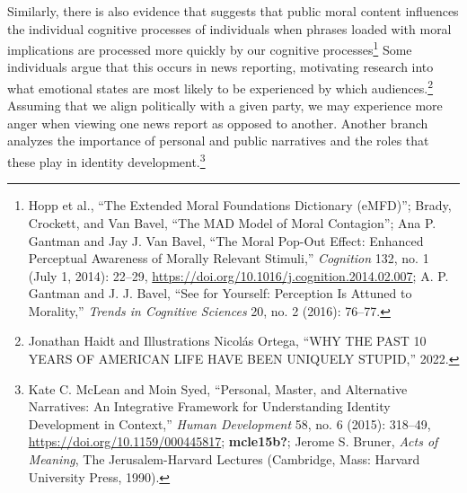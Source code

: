 \documentclass[phdthesis,12pt,final]{wuthesis}
\theoremstyle{definition}
\theoremstyle{definition}
\theoremstyle{definition}
\theoremstyle{definition}
\theoremstyle{remark}
\begin{document}
Similarly, there is also evidence that suggests that public moral content influences the individual cognitive processes of individuals when phrases loaded with moral implications are processed more quickly by our cognitive processes\footnote{Hopp et al., {``The Extended {Moral Foundations Dictionary} ({eMFD})''}; Brady, Crockett, and Van Bavel, {``The {MAD} Model of Moral Contagion''}; Ana P. Gantman and Jay J. Van Bavel, {``The Moral Pop-Out Effect: {Enhanced} Perceptual Awareness of Morally Relevant Stimuli,''} \emph{Cognition} 132, no. 1 (July 1, 2014): 22--29, \url{https://doi.org/10.1016/j.cognition.2014.02.007}; A. P. Gantman and J. J. Bavel, {``See for Yourself: Perception Is Attuned to Morality,''} \emph{Trends in Cognitive Sciences} 20, no. 2 (2016): 76--77.} Some individuals argue that this occurs in news reporting, motivating research into what emotional states are most likely to be experienced by which audiences.\footnote{Jonathan Haidt and Illustrations Nicolás Ortega, {``{WHY THE PAST} 10 {YEARS OF AMERICAN LIFE HAVE BEEN UNIQUELY STUPID},''} 2022.} Assuming that we align politically with a given party, we may experience more anger when viewing one news report as opposed to another. Another branch analyzes the importance of personal and public narratives and the roles that these play in identity development.\footnote{Kate C. McLean and Moin Syed, {``Personal, {Master}, and {Alternative Narratives}: {An Integrative Framework} for {Understanding Identity Development} in {Context},''} \emph{Human Development} 58, no. 6 (2015): 318--49, \url{https://doi.org/10.1159/000445817}; \textbf{mcle15b?}; Jerome S. Bruner, \emph{Acts of Meaning}, The {Jerusalem-Harvard} Lectures (Cambridge, Mass: Harvard University Press, 1990).}
\end{document}
